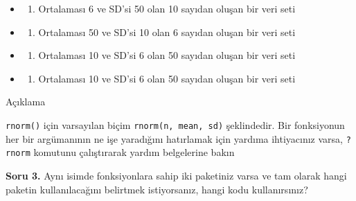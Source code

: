 \documentclass[
  oneside]{book}
\providecommand{\tightlist}{%
  \setlength{\itemsep}{0pt}\setlength{\parskip}{0pt}}
\begin{document}
\begin{itemize}
\item
  \begin{enumerate}
  \def\labelenumi{(\Alph{enumi})}
  \tightlist
  \item
    Ortalaması 6 ve SD'si 50 olan 10 sayıdan oluşan bir veri seti\\
  \end{enumerate}
\item
  \begin{enumerate}
  \def\labelenumi{(\Alph{enumi})}
  \setcounter{enumi}{1}
  \tightlist
  \item
    Ortalaması 50 ve SD'si 10 olan 6 sayıdan oluşan bir veri seti\\
  \end{enumerate}
\item
  \begin{enumerate}
  \def\labelenumi{(\Alph{enumi})}
  \setcounter{enumi}{2}
  \tightlist
  \item
    Ortalaması 10 ve SD'si 6 olan 50 sayıdan oluşan bir veri seti\\
  \end{enumerate}
\item
  \begin{enumerate}
  \def\labelenumi{(\Alph{enumi})}
  \setcounter{enumi}{3}
  \tightlist
  \item
    Ortalaması 10 ve SD'si 6 olan 50 sayıdan oluşan bir veri seti
  \end{enumerate}
\end{itemize}

Açıklama

\texttt{rnorm()} için varsayılan biçim \texttt{rnorm(n,\ mean,\ sd)} şeklindedir. Bir fonksiyonun her bir argümanının ne işe yaradığını hatırlamak için yardıma ihtiyacınız varsa, \texttt{?rnorm} komutunu çalıştırarak yardım belgelerine bakın

\textbf{Soru 3.} Aynı isimde fonksiyonlara sahip iki paketiniz varsa ve tam olarak hangi paketin kullanılacağını belirtmek istiyorsanız, hangi kodu kullanırsınız?
\end{document}
